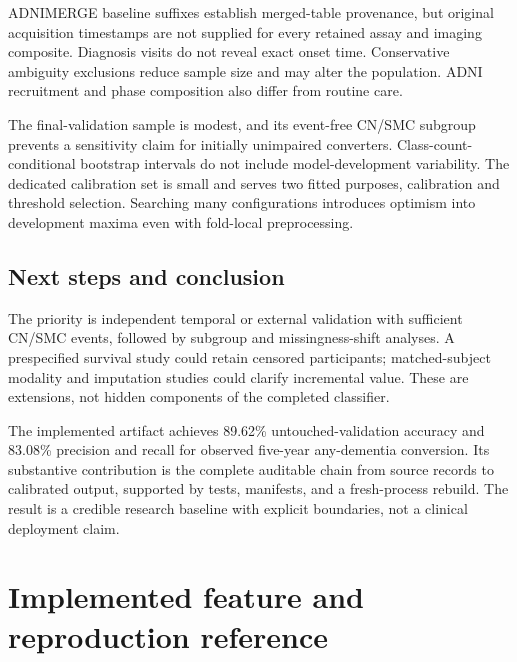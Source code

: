 \documentclass[11pt,a4paper]{article}
\begin{document}
ADNIMERGE baseline suffixes establish merged-table provenance, but original acquisition timestamps are not supplied for every retained assay and imaging composite. Diagnosis visits do not reveal exact onset time. Conservative ambiguity exclusions reduce sample size and may alter the population. ADNI recruitment and phase composition also differ from routine care.

The final-validation sample is modest, and its event-free CN/SMC subgroup prevents a sensitivity claim for initially unimpaired converters. Class-count-conditional bootstrap intervals do not include model-development variability. The dedicated calibration set is small and serves two fitted purposes, calibration and threshold selection. Searching many configurations introduces optimism into development maxima even with fold-local preprocessing.
\subsection{Next steps and conclusion}
The priority is independent temporal or external validation with sufficient CN/SMC events, followed by subgroup and missingness-shift analyses. A prespecified survival study could retain censored participants; matched-subject modality and imputation studies could clarify incremental value. These are extensions, not hidden components of the completed classifier.

The implemented artifact achieves 89.62\% untouched-validation accuracy and 83.08\% precision and recall for observed five-year any-dementia conversion. Its substantive contribution is the complete auditable chain from source records to calibrated output, supported by tests, manifests, and a fresh-process rebuild. The result is a credible research baseline with explicit boundaries, not a clinical deployment claim.

\clearpage
\appendix\section{Implemented feature and reproduction reference}
\end{document}
